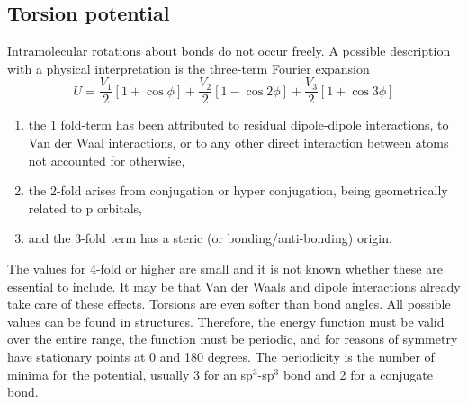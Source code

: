 \subsection{Torsion potential}

Intramolecular rotations about bonds do not occur freely. A possible description with a physical interpretation
is the three-term Fourier expansion
\begin{equation}
U=\frac{V_1}{2}\left[1+\cos\phi\right]+
  \frac{V_2}{2}\left[1-\cos2\phi\right]+
  \frac{V_3}{2}\left[1+\cos3\phi\right]
\end{equation}
\begin{enumerate}
\item{the 1 fold-term has been attributed to residual dipole-dipole interactions, to Van der Waal interactions,
or to any other direct interaction between atoms not accounted for otherwise,}
\item{the 2-fold arises from conjugation or hyper conjugation, being geometrically related to p orbitals,}
\item{and the 3-fold term has a steric (or bonding/anti-bonding) origin.}
\end{enumerate}
The values for 4-fold or higher are small and it is not known whether these are essential to include.
It may be that Van der Waals and dipole interactions already take care of these effects.
Torsions are even softer than bond angles. All possible values can be found in structures. Therefore, the
energy function must be valid over the entire range, the function must be periodic, and for reasons of
symmetry have stationary points at 0 and 180 degrees. The periodicity is the number of minima for the
potential, usually 3 for an sp$^3$-sp$^3$ bond and 2 for a conjugate bond.


